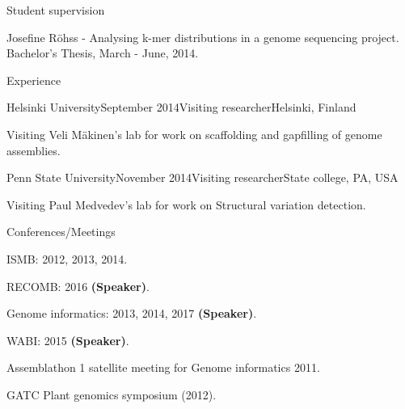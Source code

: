 \documentclass{resume} %
\begin{document}
\begin{rSection}{Student supervision}
\item Josefine R{\"o}hss - Analysing k-mer distributions in a genome sequencing project. Bachelor's Thesis, March - June, 2014.
\end{rSection}


\begin{rSection}{Experience}

\begin{rSubsection}{Helsinki University}{September 2014}{Visiting researcher}{Helsinki, Finland}
\item Visiting Veli M{\"a}kinen's lab for work on scaffolding and gapfilling of genome assemblies.
\end{rSubsection}

\begin{rSubsection}{Penn State University}{November 2014}{Visiting researcher}{State college, PA, USA}
\item Visiting Paul Medvedev's lab for work on Structural variation detection.
\end{rSubsection}


\begin{rSubsection}{Conferences/Meetings}{}{}{}
\item ISMB: 2012, 2013, 2014.
\item RECOMB: 2016 \textbf{(Speaker)}.
\item Genome informatics: 2013, 2014, 2017 \textbf{(Speaker)}.
\item WABI: 2015 \textbf{(Speaker)}.
\item Assemblathon 1 satellite meeting for Genome informatics 2011.
\item GATC Plant genomics symposium (2012). 
\end{rSubsection}


\end{rSection}

\end{document}
